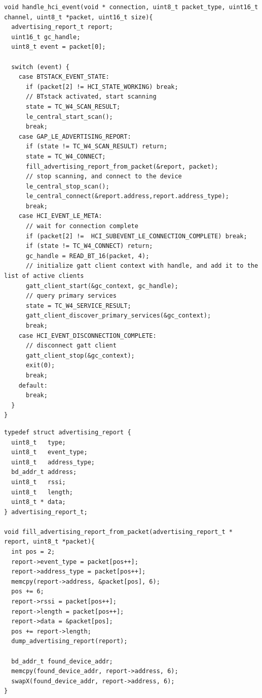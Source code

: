 \documentclass[a4paper,titlepage,oneside,12pt]{amsart} %
\begin{document}
\begin{lstlisting}[caption= Advertising report handling., label=code:gattBrowserHCIPacketHandler]
void handle_hci_event(void * connection, uint8_t packet_type, uint16_t channel, uint8_t *packet, uint16_t size){
  advertising_report_t report;
  uint16_t gc_handle;
  uint8_t event = packet[0];
  
  switch (event) {
    case BTSTACK_EVENT_STATE:
      if (packet[2] != HCI_STATE_WORKING) break;
      // BTstack activated, start scanning
      state = TC_W4_SCAN_RESULT;
      le_central_start_scan(); 
      break;
    case GAP_LE_ADVERTISING_REPORT:
      if (state != TC_W4_SCAN_RESULT) return;
      state = TC_W4_CONNECT;
      fill_advertising_report_from_packet(&report, packet);
      // stop scanning, and connect to the device
      le_central_stop_scan();
      le_central_connect(&report.address,report.address_type);
      break;
    case HCI_EVENT_LE_META:
      // wait for connection complete
      if (packet[2] !=  HCI_SUBEVENT_LE_CONNECTION_COMPLETE) break;
      if (state != TC_W4_CONNECT) return;
      gc_handle = READ_BT_16(packet, 4);
      // initialize gatt client context with handle, and add it to the list of active clients
      gatt_client_start(&gc_context, gc_handle);
      // query primary services
      state = TC_W4_SERVICE_RESULT;
      gatt_client_discover_primary_services(&gc_context);
      break;
    case HCI_EVENT_DISCONNECTION_COMPLETE:
      // disconnect gatt client 
      gatt_client_stop(&gc_context);
      exit(0);
      break;
    default:
      break;
  }
}
\end{lstlisting}

\begin{lstlisting}[caption=Convenience function for filling advertising report struct from data packet., label=code:gattBrowserAdvReport]
typedef struct advertising_report {
  uint8_t   type;
  uint8_t   event_type;
  uint8_t   address_type;
  bd_addr_t address;
  uint8_t   rssi;
  uint8_t   length;
  uint8_t * data;
} advertising_report_t;

void fill_advertising_report_from_packet(advertising_report_t * report, uint8_t *packet){
  int pos = 2;
  report->event_type = packet[pos++];
  report->address_type = packet[pos++];
  memcpy(report->address, &packet[pos], 6);
  pos += 6;
  report->rssi = packet[pos++];
  report->length = packet[pos++];
  report->data = &packet[pos];
  pos += report->length;
  dump_advertising_report(report);
  
  bd_addr_t found_device_addr;
  memcpy(found_device_addr, report->address, 6);
  swapX(found_device_addr, report->address, 6);
}
\end{lstlisting}
\end{document}
